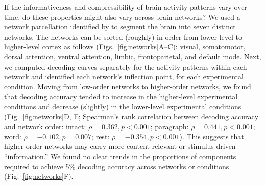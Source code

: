 \documentclass[english, 11pt]{article}
\begin{document}
If the informativeness and compressibility of brain activity patterns vary over
time, do these properties might also vary across brain networks? We used a
network parcellation identified by \cite{YeoEtal11} to segment the brain into
seven distinct networks. The networks can be sorted (roughly) in order from
lower-level to higher-level cortex as follows (Figs.~\ref{fig:networks}A--C):
visual, somatomotor, dorsal attention, ventral attention, limbic,
frontoparietal, and default mode. Next, we computed decoding curves separately
for the activity patterns within each network and identified each network's
inflection point, for each experimental condition. Moving from low-order
networks to higher-order networks, we found that decoding accuracy tended to
increase in the higher-level experimental conditions and decrease (slightly) in
the lower-level experimental conditions (Fig.~\ref{fig:networks}D, E;
Spearman's rank correlation between decoding accuracy and network order:
intact: $\rho = 0.362, p < 0.001$; paragraph: $\rho = 0.441, p < 0.001$; word:
$\rho = -0.102, p = 0.007$; rest: $\rho = -0.354, p < 0.001$). This suggests
that higher-order networks may carry more content-relevant or stimulus-driven
``information.'' We found no clear trends in the proportions of components
required to achieve 5\% decoding accuracy across networks or conditions
(Fig.~\ref{fig:networks}F).
\end{document}
